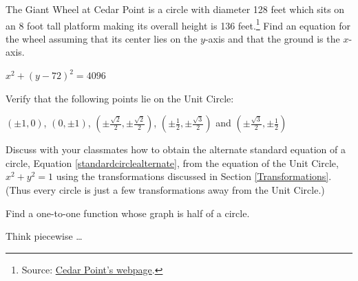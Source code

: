 \documentclass{ximera}
\begin{document}
\begin{problem}\label{giantwheelcircle}
The Giant Wheel at Cedar Point is a circle with diameter 128 feet which sits on an 8 foot tall platform making its overall height is 136 feet.\footnote{Source: \href{http://www.cedarpoint.com/public/park/rides/tranquil/giant_wheel.cfm}{\underline{Cedar Point's webpage}}.}  Find an equation for the wheel assuming that its center lies on the $y$-axis and that the ground is the $x$-axis.

\begin{solution}
    $x^{2} + (y - 72)^{2} = 4096$
\end{solution}
\end{problem}

\begin{problem}
Verify that the following points lie on the Unit Circle:

 $(\pm 1, 0)$, $(0, \pm 1)$, $\left(\pm \frac{\sqrt{2}}{2}, \pm \frac{\sqrt{2}}{2}\right)$, $\left(\pm \frac{1}{2}, \pm \frac{\sqrt{3}}{2}\right)$ and  $\left(\pm \frac{\sqrt{3}}{2}, \pm \frac{1}{2}\right)$
\end{problem}

\begin{problem}\label{circletransunitcircleexercise}
Discuss with your classmates how to obtain the alternate standard equation of a circle, Equation \ref{standardcirclealternate}, from the equation of the Unit Circle, $x^2+y^2=1$ using the transformations discussed in Section \ref{Transformations}.  (Thus every circle is just a few transformations away from the Unit Circle.)
\end{problem}

\begin{problem}
Find a one-to-one function whose graph is half of a circle. 

\begin{hint}
Think piecewise \ldots   
\end{hint}
\end{problem}
\end{document}
